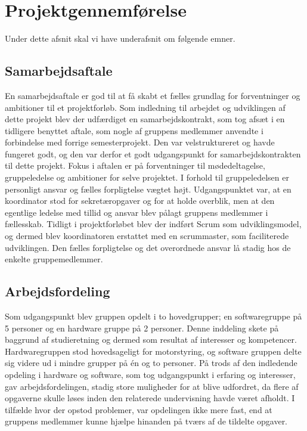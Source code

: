 \chapter{Projektgennemførelse}

Under dette afsnit skal vi have underafsnit om følgende emner.


\section{Samarbejdsaftale}
En samarbejdsaftale er god til at få skabt et fælles grundlag for forventninger og ambitioner til et projektforløb. Som indledning til arbejdet og udviklingen af dette projekt blev der udfærdiget en samarbejdskontrakt, som tog afsæt i en tidligere benyttet aftale, som nogle af gruppens medlemmer anvendte i forbindelse med forrige semesterprojekt. Den var velstruktureret og havde fungeret godt, og den var derfor et godt udgangspunkt for samarbejdskontrakten til dette projekt. Fokus i aftalen er på forventninger til mødedeltagelse, gruppeledelse og ambitioner for selve projektet. I forhold til gruppeledelsen er personligt ansvar og fælles forpligtelse vægtet højt. Udgangspunktet var, at en koordinator stod for sekretæropgaver og for at holde overblik, men at den egentlige ledelse med tillid og ansvar blev pålagt gruppens medlemmer i fællesskab. Tidligt i projektforløbet blev der indført Scrum som udviklingsmodel, og dermed blev koordinatoren erstattet med en scrummaster, som faciliterede udviklingen. Den fælles forpligtelse og det overordnede ansvar lå stadig hos de enkelte gruppemedlemmer.

\section{Arbejdsfordeling}
Som udgangspunkt blev gruppen opdelt i to hovedgrupper; en softwaregruppe på 5 personer og en hardware gruppe på 2 personer. Denne inddeling skete på baggrund af studieretning og dermed som resultat af interesser og kompetencer. Hardwaregruppen stod hovedsageligt for motorstyring, og software gruppen delte sig videre ud i mindre grupper på én og to personer. På trods af den indledende opdeling i hardware og software, som tog udgangspunkt i erfaring og interesser, gav arbejdsfordelingen, stadig store muligheder for at blive udfordret, da flere af opgaverne skulle løses inden den relaterede undervisning havde været afholdt. I tilfælde hvor der opstod problemer, var opdelingen ikke mere fast, end at gruppens medlemmer kunne hjælpe hinanden på tværs af de tildelte opgaver. \\


